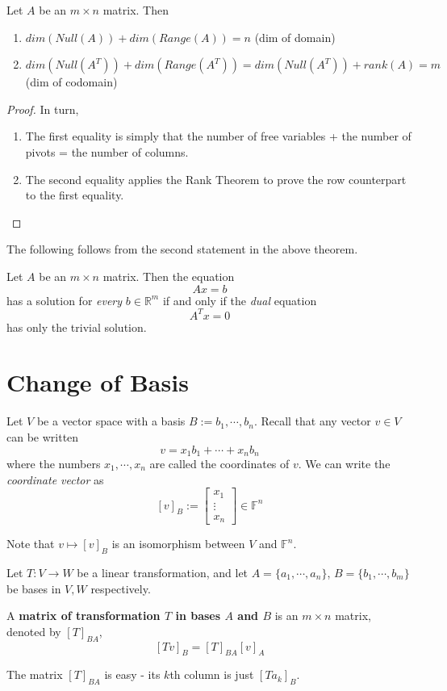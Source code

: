 \begin{theorem}
Let $A$ be an $m \times n$ matrix. Then 
\begin{enumerate}
	\item $dim(Null(A)) + dim(Range(A)) = n$ (dim of domain)
	\item $dim(Null(A^{T})) + dim(Range(A^{T})) = dim(Null(A^{T})) + rank(A) = m$ (dim of codomain)
\end{enumerate}
\end{theorem}

\begin{proof}
In turn, 
\begin{enumerate}
	\item The first equality is simply that the number of free variables + the number of pivots = the number of columns. 
	\item The second equality applies the Rank Theorem to prove the row counterpart to the first equality. 
\end{enumerate}
\end{proof}

The following follows from the second statement in the above theorem. 
\begin{theorem}
Let $A$ be an $m \times n$ matrix. Then the equation 
$$Ax = b$$ 
has a solution for \textit{every} $b \in \mathbb{R}^{m}$ if and only if the \textit{dual} equation 
$$A^{T}x = 0$$ 
has only the trivial solution. 
\end{theorem}

\section{Change of Basis}
Let $V$ be a vector space with a basis $B := b_{1}, \cdots, b_{n}$. Recall that any vector $v \in V$ can be written
$$v = x_{1} b_{1} + \cdots + x_{n} b_{n}$$
where the numbers $x_{1}, \cdots, x_{n}$ are called the coordinates of $v$. We can write the \textit{coordinate vector} as 
$$[v]_{B} := \begin{bmatrix}
x_{1} \\
\vdots \\
x_{n}
\end{bmatrix} \in \mathbb{F}^{n}$$

Note that $v \mapsto [v]_{B}$ is an isomorphism between $V$ and $\mathbb{F}^{n}$.

\begin{definition}
Let $T: V \rightarrow W$ be a linear transformation, and let $A = \{a_{1}, \cdots, a_{n}\}$, $B = \{ b_{1}, \cdots, b_{m} \}$ be bases in $V,W$ respectively. 

A \textbf{matrix of transformation $T$ in bases $A$ and $B$} is an $m \times n$ matrix, denoted by $[T]_{BA}$, 
$$[Tv]_{B} = [T]_{BA} [v]_{A}$$

The matrix $[T]_{BA}$ is easy - its $k$th column is just $[Ta_{k}]_{B}$. 
\end{definition}

